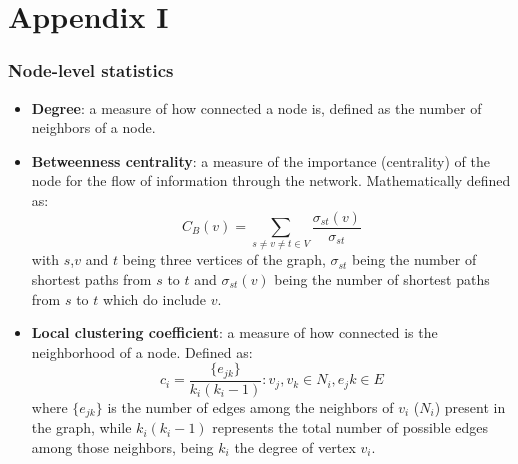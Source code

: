 \graphicspath{{chapters/90_appendix_i/images}}
\chapter*{Appendix I}


\subsection*{Node-level statistics}

\begin{itemize}\tightlist
  \item \textbf{Degree}: a measure of how connected a node is, defined as the number of neighbors of a node.
  \item \textbf{Betweenness centrality}: a measure of the importance (centrality) of the node for the flow of information through the network. Mathematically defined as:
  $$C_B(v) = \sum_{s \neq v \neq t \in V} \frac{\sigma_{st}(v)}{\sigma_{st}}$$
  with $s$,$v$ and $t$ being three vertices of the graph, $\sigma_{st}$ being the number of shortest paths from $s$ to $t$ and $\sigma_{st}(v)$ being the number of shortest paths from $s$ to $t$ which do include $v$.
  \item \textbf{Local clustering coefficient}: a measure of how connected is the neighborhood of a node. Defined as:
  $$c_i = \frac{\{e_{jk}\}}{k_i(k_i-1)} : v_j,v_k \in N_i, e_jk \in E$$
  where $\{e_{jk}\}$ is the number of edges among the neighbors of $v_i$ ($N_i$) present in the graph, while $k_i(k_i-1)$ represents the total number of possible edges among those neighbors, being $k_i$ the degree of vertex $v_i$.
\end{itemize}